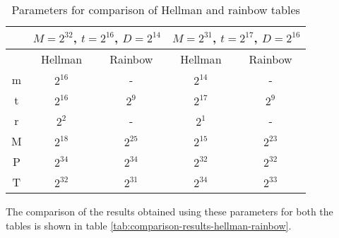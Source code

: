\begin{table}[ht!]
\begin{center}
\caption{Parameters for comparison of Hellman and rainbow tables}
\smallskip
\smallskip
\begin{tabular}{|c|c c||c c|}
\hline
			& \multicolumn{2}{c||}{$M = 2^{32}$, $t = 2^{16}$, $D = 2^{14}$} 	& \multicolumn{2}{c|}{$M = 2^{31}$, $t = 2^{17}$, $D = 2^{16}$}	\\ \hline \hline
			&	Hellman				&	Rainbow					&	Hellman					& Rainbow				\\ \hline \hline
m			&	$2^{16}$			&		-							&	$2^{14}$				& 	-						\\ \hline 
t			&	$2^{16}$			&	$2^{9}$					&	$2^{17}$				& $2^{9}$				\\ \hline 
r			&	$2^{2}$				&		-							&	$2^{1}$					& 	-						\\ \hline 
M			&	$2^{18}$			&	$2^{25}$				&	$2^{15}$				& $2^{23}$			\\ \hline 
P			&	$2^{34}$			&	$2^{34}$				&	$2^{32}$				& $2^{32}$			\\ \hline 
T			&	$2^{32}$			&	$2^{31}$				&	$2^{34}$				& $2^{33}$			\\ \hline 
\end{tabular}
\end{center} 
\label{tab:parameters-comparison}
\end{table}

The comparison of the results obtained using these parameters for both the tables is shown in table \ref{tab:comparison-results-hellman-rainbow}. 

